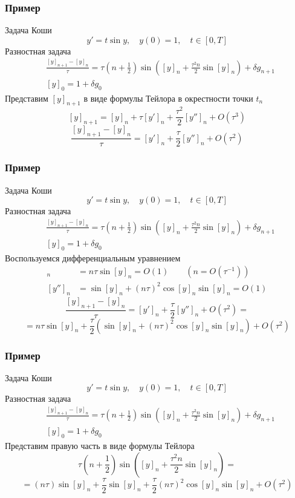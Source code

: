 \documentclass[apectratio=43,unicode]{beamer}
\begin{document}
\begin{frame}\frametitle{Пример}
	Задача Коши
	$$
	y' = t \sin y, \quad y(0) = 1, \quad t \in [0, T]
	$$
	Разностная задача
	\begin{align*}
	&\frac{[y]_{n+1} - [y]_n}{\tau} = \tau\left(n+\frac{1}{2}\right)\sin\left([y]_n + \frac{\tau^2 n}{2} 
		\sin [y]_n\right) + \delta g_{n+1}\\
	&[y]_0 = 1 + \delta g_0
	\end{align*}
	Представим $[y]_{n+1}$ в виде формулы Тейлора в окрестности точки $t_n$
	$$
	[y]_{n+1} = [y]_n + \tau [y']_n + \frac{\tau^2}{2} [y'']_n + O(\tau^3)
	$$
	$$
	\frac{[y]_{n+1} - [y]_n}{\tau} = [y']_n + \frac{\tau}{2} [y'']_n + O(\tau^2)
	$$
\end{frame}

\begin{frame}\frametitle{Пример}
	Задача Коши
	$$
	y' = t \sin y, \quad y(0) = 1, \quad t \in [0, T]
	$$
	Разностная задача
	\begin{align*}
	&\frac{[y]_{n+1} - [y]_n}{\tau} = \tau\left(n+\frac{1}{2}\right)\sin\left([y]_n + \frac{\tau^2 n}{2} 
		\sin [y]_n\right) + \delta g_{n+1}\\
	&[y]_0 = 1 + \delta g_0
	\end{align*}
	Воспользуемся дифференциальным уравнением
	\begin{align*}
	[y']_n &= n \tau \sin [y]_n = O(1)\qquad (n = O(\tau^{-1}))\\
	[y'']_n &= \sin [y]_n + (n\tau)^2 \cos [y]_n \sin[y]_n = O(1)
	\end{align*}
	$$
	\frac{[y]_{n+1} - [y]_n}{\tau} = [y']_n + \frac{\tau}{2} [y'']_n + O(\tau^2) =
	$$
	$$
	= n\tau \sin [y]_n  + \frac{\tau}{2}\left(\sin [y]_n + (n\tau)^2 \cos [y]_n \sin[y]_n\right) + O(\tau^2)
	$$
\end{frame}

\begin{frame}\frametitle{Пример}
	Задача Коши
	$$
	y' = t \sin y, \quad y(0) = 1, \quad t \in [0, T]
	$$
	Разностная задача
	\begin{align*}
	&\frac{[y]_{n+1} - [y]_n}{\tau} = \tau\left(n+\frac{1}{2}\right)\sin\left([y]_n + \frac{\tau^2 n}{2}
		\sin [y]_n\right) + \delta g_{n+1}\\
	&[y]_0 = 1 + \delta g_0
	\end{align*}
	Представим правую часть в виде формулы Тейлора
	$$
	\tau\left(n+\frac{1}{2}\right)\sin\left([y]_n + \frac{\tau^2 n}{2} \sin [y]_n\right) = 
	$$
	$$
	= (n\tau)\sin [y]_n + \frac{\tau}{2}\sin [y]_n + \frac{\tau}{2}(n\tau)^2\cos[y]_n\sin[y]_n + O(\tau^2)
	$$
\end{frame}
\end{document}
